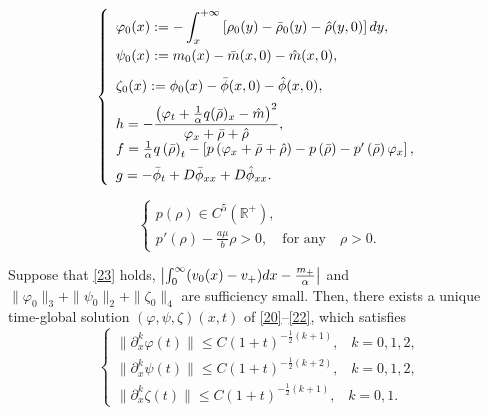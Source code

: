 \documentclass[10pt,a4paper]{amsart}
\begin{document}
	\begin{equation}\label{22}
		\left\{
		\begin{array}{lr}
		\varphi_0(x):= -\displaystyle\int^{+\infty}_{x} \left[\rho_{0}(y)-\bar{\rho}_0(y)-\hat{\rho}(y,0) \right] {\rm d}y,\\[3mm]
\psi_0(x):=m_0(x)-\bar{m}(x,0)-\hat{m}(x,0),\\[3mm]
\zeta_0(x):=\phi_0(x)-\bar{\phi}(x,0)-\hat{\phi}(x,0),\\[2mm]
			h=-\displaystyle\frac{\left(\varphi_t+\frac{1}{\alpha}q(\bar\rho)_x-\hat m\right)^2}{\varphi_x+\bar\rho+\hat\rho},\\[2mm]
			f=\frac{1}{\alpha}q\left(\bar\rho\right)_t-\left[p\left(\varphi_x+\bar\rho+\hat\rho\right)-p\left(\bar\rho\right)-p^{\prime}\left(\bar\rho\right)\varphi_x\right],\\[2mm]
			g=-\bar\phi_t+D\bar\phi_{xx}+D\hat\phi_{xx}.
		\end{array}
		\right.
	\end{equation}

	\begin{equation}\label{23}
		\left\{
		\begin{array}{lr}
			p(\rho)\in C^5(\mathbb{R}^{+}),\\[2mm]
			p'(\rho) - \frac{a\mu}{b}\rho > 0, \quad \text{for any} \quad \rho > 0.
		\end{array}
		\right.
	\end{equation}

	\begin{theorem}\label{thm1}
	Suppose that \eqref{23} holds, $\left|\int_{0}^{\infty} (v_0(x) - v_+){\rm d}x - \frac{m_+}{\alpha}\right|$ and $\|\varphi_{0}\|_{3}+\|\psi_{0}\|_{2}+\|\zeta_{0}\|_{4}$ are sufficiency small.
		 Then, there exists a unique time-global solution $(\varphi,\psi,\zeta)(x,t)$ of \eqref{20}--\eqref{22}, which satisfies
		\begin{equation}\label{24}
			\left\{
			\begin{array}{lr}
				\|\partial_x^k\varphi(t)\|\leq C (1+t)^{-\frac{1}{2}(k+1)},\;\;\;k=0,1,2,\\[2mm]
				\|\partial_x^k\psi(t)\|\leq C (1+t)^{-\frac{1}{2}(k+2)},\;\;\;k=0,1,2,\\[2mm]
				\|\partial_x^k\zeta(t)\|\leq C (1+t)^{-\frac{1}{2}(k+1)},\;\;\;k=0,1.
			\end{array}
			\right.
		\end{equation}
	\end{theorem}
\end{document}
